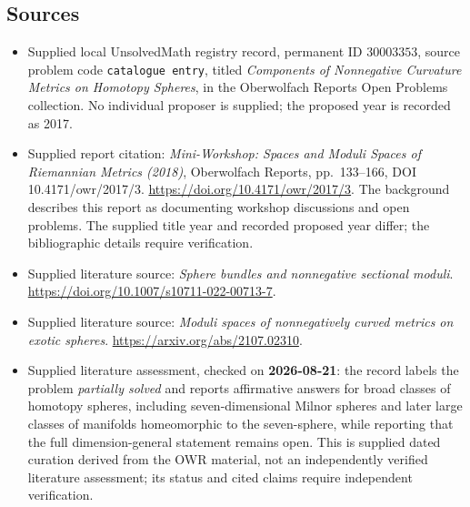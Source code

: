 \documentclass[11pt]{article}
\begin{document}
\subsection{Sources}
\begin{itemize}
\item Supplied local UnsolvedMath registry record, permanent ID \(30003353\), source problem code \texttt{catalogue entry}, titled \emph{Components of Nonnegative Curvature Metrics on Homotopy Spheres}, in the Oberwolfach Reports Open Problems collection. No individual proposer is supplied; the proposed year is recorded as 2017.
\item Supplied report citation: \emph{Mini-Workshop: Spaces and Moduli Spaces of Riemannian Metrics (2018)}, Oberwolfach Reports, pp.\ 133--166, DOI 10.4171/owr/2017/3. \url{https://doi.org/10.4171/owr/2017/3}. The background describes this report as documenting workshop discussions and open problems. The supplied title year and recorded proposed year differ; the bibliographic details require verification.
\item Supplied literature source: \emph{Sphere bundles and nonnegative sectional moduli}. \url{https://doi.org/10.1007/s10711-022-00713-7}.
\item Supplied literature source: \emph{Moduli spaces of nonnegatively curved metrics on exotic spheres}. \url{https://arxiv.org/abs/2107.02310}.
\item Supplied literature assessment, checked on \textbf{2026-08-21}: the record labels the problem \emph{partially solved} and reports affirmative answers for broad classes of homotopy spheres, including seven-dimensional Milnor spheres and later large classes of manifolds homeomorphic to the seven-sphere, while reporting that the full dimension-general statement remains open. This is supplied dated curation derived from the OWR material, not an independently verified literature assessment; its status and cited claims require independent verification.
\end{itemize}
\end{document}
